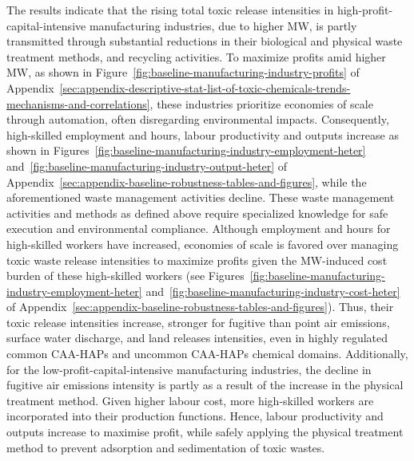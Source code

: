 \documentclass[authoryear, preprint, twocolumn, 1p]{elsarticle}
\begin{document}
    The results indicate that the rising total toxic release intensities in high-profit-capital-intensive manufacturing industries, due to higher MW, is partly transmitted through substantial reductions in their biological and physical waste treatment methods, and recycling activities. To maximize profits amid higher MW, as shown in Figure~\ref{fig:baseline-manufacturing-industry-profits} of Appendix~\ref{sec:appendix-descriptive-stat-list-of-toxic-chemicals-trends-mechanisms-and-correlations}, these industries prioritize economies of scale through automation, often disregarding environmental impacts. Consequently, high-skilled employment and hours, labour productivity and outputs increase as shown in Figures~\ref{fig:baseline-manufacturing-industry-employment-heter} and~\ref{fig:baseline-manufacturing-industry-output-heter} of Appendix~\ref{sec:appendix-baseline-robustness-tables-and-figures}, while the aforementioned waste management activities decline. These waste management activities and methods as defined above require specialized knowledge for safe execution and environmental compliance. Although employment and hours for high-skilled workers have increased, economies of scale is favored over managing toxic waste release intensities to maximize profits given the MW-induced cost burden of these high-skilled workers (see Figures~\ref{fig:baseline-manufacturing-industry-employment-heter} and~\ref{fig:baseline-manufacturing-industry-cost-heter} of Appendix~\ref{sec:appendix-baseline-robustness-tables-and-figures}). Thus, their toxic release intensities increase, stronger for fugitive than point air emissions, surface water discharge, and land releases intensities, even in highly regulated common CAA-HAPs and uncommon CAA-HAPs chemical domains. Additionally, for the low-profit-capital-intensive manufacturing industries, the decline in fugitive air emissions intensity is partly as a result of the increase in the physical treatment method. Given higher labour cost, more high-skilled workers are incorporated into their production functions. Hence, labour productivity and outputs increase to maximise profit, while safely applying the physical treatment method to prevent adsorption and sedimentation of toxic wastes.
\end{document}

